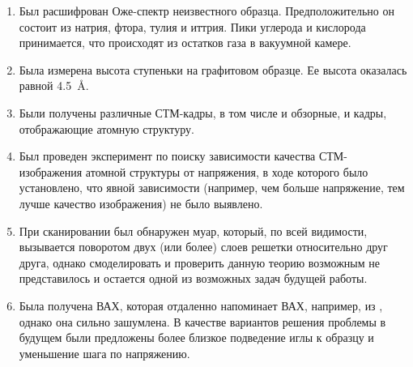 \documentclass[a4paper, 12pt]{article}
\begin{document}
	\begin{enumerate}
		\item Был расшифрован Оже-спектр неизвестного образца. Предположительно он состоит из натрия, фтора, тулия и иттрия. Пики углерода и кислорода принимается, что происходят из остатков газа в вакуумной камере.
		
		\item Была измерена высота ступеньки на графитовом образце. Ее высота оказалась равной 4.5~\AA.
		
		\item Были получены различные СТМ-кадры, в том числе и обзорные, и кадры, отображающие атомную структуру.
		
		\item Был проведен эксперимент по поиску зависимости качества СТМ-изображения атомной структуры от напряжения, в ходе которого было установлено, что явной зависимости (например, чем больше напряжение, тем лучше качество изображения) не было выявлено.
		
		\item При сканировании был обнаружен муар, который, по всей видимости, вызывается поворотом двух (или более) слоев решетки относительно друг друга, однако смоделировать и проверить данную теорию возможным не представилось и остается одной из возможных задач будущей работы.
		
		\item Была получена ВАХ, которая отдаленно напоминает ВАХ, например, из \cite{Article}, однако она сильно зашумлена. В качестве вариантов решения проблемы в будущем были предложены более близкое подведение иглы к образцу и уменьшение шага по напряжению.
	\end{enumerate}
	
	\newpage
	
\end{document}
